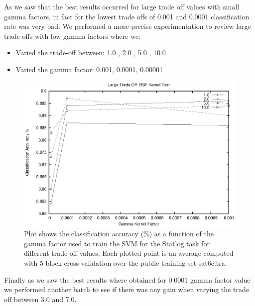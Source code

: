 \documentclass[a4paper,10pt,titlepage]{article}
\begin{document}
\par As we saw that the best results occurred for large trade off values with small gamma factors, in fact for the lowest trade offs of 0.001 and 0.0001 classification rate was very bad. We performed a more precise experimentation to review large trade offs with low gamma factors where we:
\begin{itemize}
	\item Varied the trade-off between: 1.0 , 2.0 , 5.0 , 10.0
	\item Varied the gamma factor:  0.001, 0.0001, 0.00001
\end{itemize}

\begin{figure}[H]
	\centerline{%
	\includegraphics[]{adv_1_rbf.eps}
	}
	\caption[Statlog Task: Trade off experiment classification accuracy for RBF kernel]{Plot shows the classification accuracy (\%)  as a function of the gamma factor used to train the SVM for the Statlog task for different trade off values. Each plotted point is an average computed with 5-block cross validation over the public training set sat6c.tra.}
\end{figure}


\par Finally as we saw the best results where obtained for 0.0001 gamma factor value we performed another batch to see if there was any gain when varying the trade off between 3.0 and 7.0.
\end{document}
